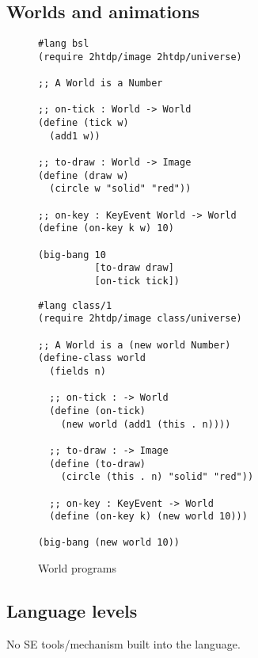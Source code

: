 \documentclass[submission,copyright]{eptcs}
\begin{document}



\subsection{Worlds and animations}


\begin{figure}
\begin{minipage}[t]{3.4in}
\begin{verbatim}
#lang bsl
(require 2htdp/image 2htdp/universe)

;; A World is a Number

;; on-tick : World -> World
(define (tick w)
  (add1 w))

;; to-draw : World -> Image
(define (draw w)
  (circle w "solid" "red"))

;; on-key : KeyEvent World -> World
(define (on-key k w) 10)

(big-bang 10
          [to-draw draw]
          [on-tick tick])
\end{verbatim}
\end{minipage}
\begin{minipage}[t]{3in}
\begin{verbatim}
#lang class/1
(require 2htdp/image class/universe)

;; A World is a (new world Number)
(define-class world
  (fields n)

  ;; on-tick : -> World
  (define (on-tick)
    (new world (add1 (this . n))))

  ;; to-draw : -> Image
  (define (to-draw) 
    (circle (this . n) "solid" "red"))

  ;; on-key : KeyEvent -> World
  (define (on-key k) (new world 10)))
  
(big-bang (new world 10))
\end{verbatim}
\end{minipage}
\caption{World programs}
\label{fig:world}
\end{figure}


\subsection{Language levels}

No SE tools/mechanism built into the language.
\end{document}
